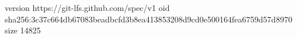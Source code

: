 version https://git-lfs.github.com/spec/v1
oid sha256:3c37c664db67083beadbcfd3b8ea413853208d9cd0e500164fea6759d57d8970
size 14825
